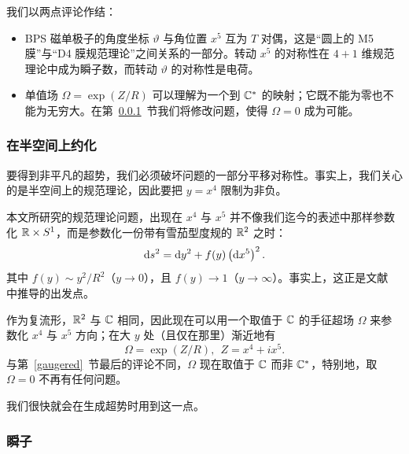 
我们以两点评论作结：
\begin{itemize}
\item BPS 磁单极子的角度坐标 $\vartheta$ 与角位置 $x^5$ 互为 $T$ 对偶，这是“圆上的 M5 膜”与“D4 膜规范理论”之间关系的一部分。转动 $x^5$ 的对称性在 $4+1$ 维规范理论中成为瞬子数，而转动 $\vartheta$ 的对称性是电荷。
\item 单值场 $\Omega=\exp(Z/R)$ 可以理解为一个到 ${\mathbb C}^*$ 的映射；它既不能为零也不能为无穷大。在第~\ref{mod}~节我们将修改问题，使得 $\Omega=0$ 成为可能。
\end{itemize}

\subsubsection{在半空间上约化}\label{mod}
要得到非平凡的超势，我们必须破坏问题的一部分平移对称性。事实上，我们关心的是半空间上的规范理论，因此要把 $y=x^4$ 限制为非负。

本文所研究的规范理论问题，出现在 $x^4$ 与 $x^5$ 并不像我们迄今的表述中那样参数化 ${\mathbb R}\times S^1$，而是参数化一份带有雪茄型度规的 ${\mathbb R}^2$ 之时：
\begin{equation}\label{cigarl}{\mathrm d} s^2={\mathrm d} y^2+f(y)\left({\mathrm d} x^5\right)^2. \end{equation}
其中 $f(y)\sim y^2/R^2$（$y\to 0$），且 $f(y)\to 1$（$y\to\infty$）。事实上，这正是文献~\cite{fiveknots} 中推导的出发点。

作为复流形，${\mathbb R}^2$ 与 ${\mathbb C}$ 相同，因此现在可以用一个取值于 ${\mathbb C}$ 的手征超场 $\Omega$ 来参数化 $x^4$ 与 $x^5$ 方向；在大 $y$ 处（且仅在那里）渐近地有
\begin{equation}\label{exo}\Omega=\exp(Z/R), ~~Z=x^4+ix^5.\end{equation}
与第~\ref{gaugered}~节最后的评论不同，$\Omega$ 现在取值于 ${\mathbb C}$ 而非 ${\mathbb C}^*$，特别地，取 $\Omega=0$ 不再有任何问题。

我们很快就会在生成超势时用到这一点。

\subsubsection{瞬子}\label{thinst}

